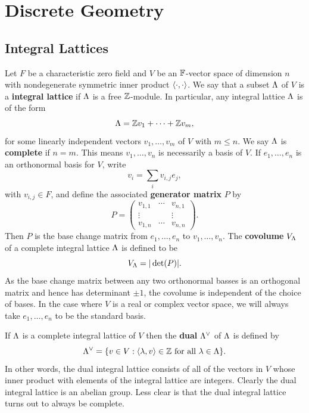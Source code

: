 \chapter{Discrete Geometry}
  \section{Integral Lattices}\label{sec:integral_lattices}
    Let \(F\) be a characteristic zero field and \(V\) be an \(\mathbb{F}\)-vector space of dimension \(n\) with nondegenerate symmetric inner product \(\langle\cdot,\cdot\rangle\). We say that a subset \(\Lambda\) of \(V\) is a \textbf{integral lattice} if \(\Lambda\) is a free \(\mathbb{Z}\)-module. In particular, any integral lattice \(\Lambda\) is of the form
    \[
      \Lambda = \mathbb{Z} v_{1}+\cdots+\mathbb{Z} v_{m},
    \]
    for some linearly independent vectors \(v_{1},\ldots,v_{m}\) of \(V\) with \(m \le n\). We say \(\Lambda\) is \textbf{complete} if \(n = m\). This means \(v_{1},\ldots,v_{n}\) is necessarily a basis of \(V\). If \(e_{1},\ldots,e_{n}\) is an orthonormal basis for \(V\), write
    \[
      v_{i} = \sum_{i}v_{i,j}e_{j},
    \]
    with \(v_{i,j} \in F\), and define the associated \textbf{generator matrix} \(P\) by
    \[
      P = \begin{pmatrix} v_{1,1} & \cdots & v_{n,1} \\ \vdots & & \vdots \\ v_{1,n} & \cdots & v_{n,n} \end{pmatrix}.
    \]
    Then \(P\) is the base change matrix from \(e_{1},\ldots,e_{n}\) to \(v_{1},\ldots,v_{n}\). The \textbf{covolume} \(V_{\Lambda}\) of a complete integral lattice \(\Lambda\) is defined to be
    \[
      V_{\Lambda} = |\det(P)|.
    \]
    As the base change matrix between any two orthonormal basses is an orthogonal matrix and hence has determinant \(\pm 1\), the covolume is independent of the choice of bases. In the case where \(V\) is a real or complex vector space, we will always take \(e_{1},\ldots,e_{n}\) to be the standard basis.
    
    If \(\Lambda\) is a complete integral lattice of \(V\) then the \textbf{dual} \(\Lambda^{\vee}\) of \(\Lambda\) is defined by
    \[
      \Lambda^{\vee} = \{v \in V:\langle\lambda,v\rangle \in \mathbb{Z} \text{ for all } \lambda \in \Lambda\}.
    \]
    In other words, the dual integral lattice consists of all of the vectors in \(V\) whose inner product with elements of the integral lattice are integers. Clearly the dual integral lattice is an abelian group. Less clear is that the dual integral lattice turns out to always be complete.

